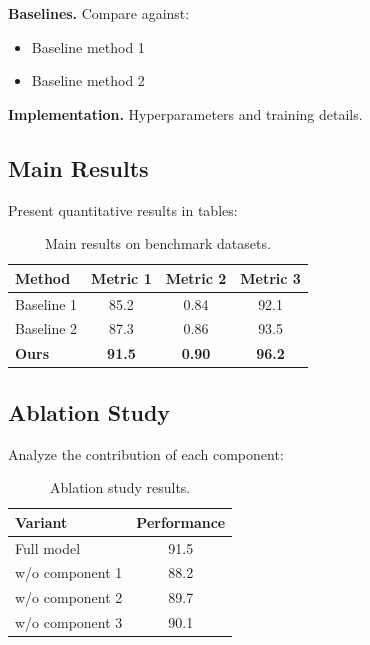 \documentclass{article}
\begin{document}
\textbf{Baselines.} Compare against:
\begin{itemize}
    \item Baseline method 1 \citep{ref1}
    \item Baseline method 2 \citep{ref2}
\end{itemize}

\textbf{Implementation.} Hyperparameters and training details.

\subsection{Main Results}

Present quantitative results in tables:

\begin{table}[t]
    \centering
    \caption{Main results on benchmark datasets.}
    \label{tab:results}
    \begin{tabular}{lccc}
        \toprule
        Method & Metric 1 & Metric 2 & Metric 3 \\
        \midrule
        Baseline 1 & 85.2 & 0.84 & 92.1 \\
        Baseline 2 & 87.3 & 0.86 & 93.5 \\
        \textbf{Ours} & \textbf{91.5} & \textbf{0.90} & \textbf{96.2} \\
        \bottomrule
    \end{tabular}
\end{table}

\subsection{Ablation Study}

Analyze the contribution of each component:

\begin{table}[t]
    \centering
    \caption{Ablation study results.}
    \label{tab:ablation}
    \begin{tabular}{lc}
        \toprule
        Variant & Performance \\
        \midrule
        Full model & 91.5 \\
        w/o component 1 & 88.2 \\
        w/o component 2 & 89.7 \\
        w/o component 3 & 90.1 \\
        \bottomrule
    \end{tabular}
\end{table}
\end{document}

